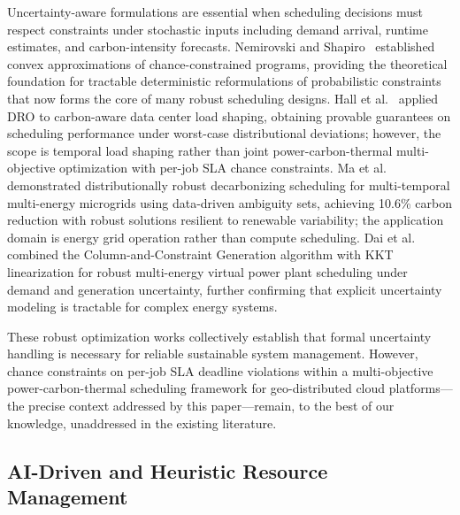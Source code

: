 \documentclass[a4paper,fleqn]{cas-dc}
\begin{document}
Uncertainty-aware formulations are essential when scheduling decisions must respect constraints under stochastic inputs including demand arrival, runtime estimates, and carbon-intensity forecasts. Nemirovski and Shapiro~\cite{ref-nemirovski06} established convex approximations of chance-constrained programs, providing the theoretical foundation for tractable deterministic reformulations of probabilistic constraints that now forms the core of many robust scheduling designs. Hall et al.~\cite{ref-hall24} applied DRO to carbon-aware data center load shaping, obtaining provable guarantees on scheduling performance under worst-case distributional deviations; however, the scope is temporal load shaping rather than joint power-carbon-thermal multi-objective optimization with per-job SLA chance constraints. Ma et al.~\cite{ref-ma24} demonstrated distributionally robust decarbonizing scheduling for multi-temporal multi-energy microgrids using data-driven ambiguity sets, achieving 10.6\% carbon reduction with robust solutions resilient to renewable variability; the application domain is energy grid operation rather than compute scheduling. Dai et al.~\cite{ref-dai25} combined the Column-and-Constraint Generation algorithm with KKT linearization for robust multi-energy virtual power plant scheduling under demand and generation uncertainty, further confirming that explicit uncertainty modeling is tractable for complex energy systems.

These robust optimization works collectively establish that formal uncertainty handling is necessary for reliable sustainable system management. However, chance constraints on per-job SLA deadline violations within a multi-objective power-carbon-thermal scheduling framework for geo-distributed cloud platforms---the precise context addressed by this paper---remain, to the best of our knowledge, unaddressed in the existing literature.

\subsection{AI-Driven and Heuristic Resource Management}
\end{document}
